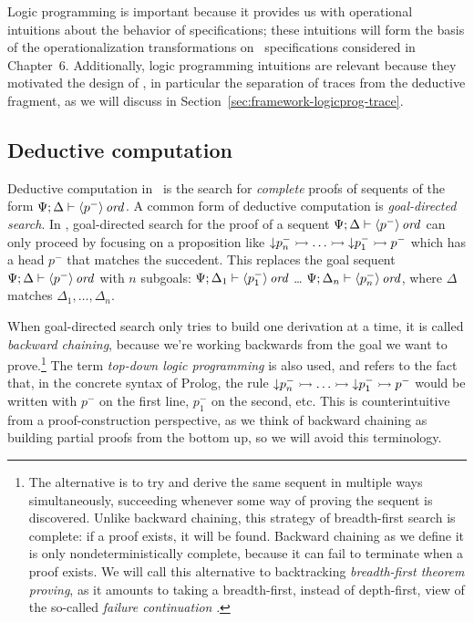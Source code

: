 Logic programming is important because it provides us with operational
intuitions about the behavior of specifications; these intuitions will
form the basis of the operationalization transformations on
\sls~specifications considered in Chapter~6. Additionally, logic
programming intuitions are relevant because they motivated the design
of \sls, in particular the separation of traces from the deductive
fragment, as we will discuss in
Section~\ref{sec:framework-logicprog-trace}.

\subsection{Deductive computation}
\label{sec:framework-logicprog-deductive}
\label{sec:framework-modes}

Deductive computation in \sls~is the search for {\it complete} proofs
of sequents of the form ${\Psi};{\Delta} \vdash {{\langle {p^-} \rangle}\,{{\it ord}}} \mathstrut$.  A
common form of deductive computation is {\it goal-directed search}.
In \sls, goal-directed search for the proof of a sequent
${\Psi};{\Delta} \vdash {{\langle {p^-} \rangle}\,{{\it ord}}} \mathstrut$ can only proceed by focusing
on a proposition like ${\downarrow}p_n^- \rightarrowtail \ldots \rightarrowtail
{\downarrow}p_1^- \rightarrowtail p^-$ which has a head $p^-$ that matches the
succedent. This replaces the goal sequent
${\Psi};{\Delta} \vdash {{\langle {p^-} \rangle}\,{{\it ord}}} \mathstrut$ with $n$ subgoals:
${\Psi};{\Delta_1} \vdash {{\langle {p_1^-} \rangle}\,{{\it ord}}} \mathstrut$ \ldots
${\Psi};{\Delta_n} \vdash {{\langle {p_n^-} \rangle}\,{{\it ord}}} \mathstrut$, where $\Delta$ matches
$\Delta_1,\ldots,\Delta_n$.

When goal-directed search only tries to build one derivation at a
time, it is called {\it backward chaining}, because we're working
backwards from the goal we want to prove.\footnote{The alternative is
  to try and derive the same sequent in multiple ways simultaneously,
  succeeding whenever some way of proving the sequent is
  discovered. Unlike backward chaining, this strategy of breadth-first
  search is complete: if a proof exists, it will be found.  Backward
  chaining as we define it is only nondeterministically complete,
  because it can fail to terminate when a proof exists. We will call
  this alternative to backtracking {\it breadth-first theorem
    proving}, as it amounts to taking a breadth-first, instead of
  depth-first, view of the so-called {\it failure continuation}
  \cite{pfenning06backtracking}.} The term {\it top-down logic
  programming} is also used, and refers to the fact that, in the
concrete syntax of Prolog, the rule ${\downarrow}p_n^- \rightarrowtail \ldots
\rightarrowtail {\downarrow}p_1^- \rightarrowtail p^-$ would be written with $p^-$ on
the first line, $p_1^-$ on the second, etc. This is counterintuitive
from a proof-construction perspective, as we think of backward
chaining as building partial proofs from the bottom up, so we will
avoid this terminology.  


